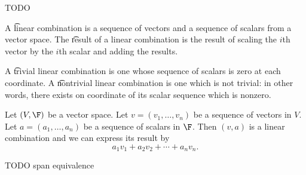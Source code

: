 

TODO


A \t{linear combination} is a sequence of vectors and a sequence of scalars from a vector space.
The \t{result of a linear combination} is the result of scaling the $i$th vector by the $i$th scalar and adding the results.

A \t{trivial linear combination} is one whose sequence of scalars is zero at each coordinate.
A \t{nontrivial linear combination} is one which is not trivial: in other words, there exists on coordinate of its scalar sequence which is nonzero.


Let $(V, \F)$ be a vector space.
Let $v = (v_1, \dots, v_n)$ be a sequence of vectors in $V$.
Let $a = (a_1, \dots, a_n)$ be a sequence of scalars in $\F$.
Then $(v, a)$ is a linear combination and we can express its result by
$$
  a_1v_1 + a_2v_2 + \cdots + a_n v_n.
$$


TODO span equivalence
